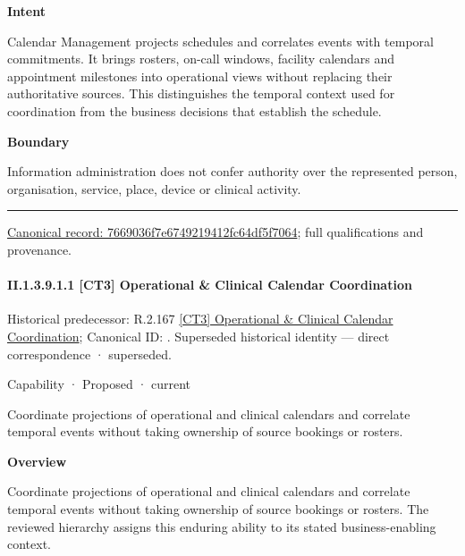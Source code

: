\textbf{Intent}



Calendar Management projects schedules and correlates events with temporal commitments. It brings rosters, on-call windows, facility calendars and appointment milestones into operational views without replacing their authoritative sources. This distinguishes the temporal context used for coordination from the business decisions that establish the schedule.



\textbf{Boundary}



Information administration does not confer authority over the represented person, organisation, service, place, device or clinical activity.



\medskip\hrule\medskip

{\footnotesize \href{../../../../continuum/strategy/capability/7669036f7e6749219412fc64df5f7064.md}{Canonical record: 7669036f7e6749219412fc64df5f7064}; full qualifications and provenance.}\par
\paragraph*{II.1.3.9.1.1 [CT3] Operational \& Clinical Calendar Coordination}
\label{navigation:II.1.3.9.1.1}

{\small Historical predecessor: R.2.167 \hyperref[element:c0f6e5f7f5a94d1580fa6e0e8b82c93a]{[CT3] Operational \& Clinical Calendar Coordination}; Canonical ID: \texttt{}. Superseded historical identity — direct correspondence · superseded.}\par
\label{element:f6d8f1310ba543f69e8b57bf05603db3}
{\small Capability · Proposed · current}\par

Coordinate projections of operational and clinical calendars and correlate temporal events without taking ownership of source bookings or rosters.



\textbf{Overview}



Coordinate projections of operational and clinical calendars and correlate temporal events without taking ownership of source bookings or rosters. The reviewed hierarchy assigns this enduring ability to its stated business-enabling context.



